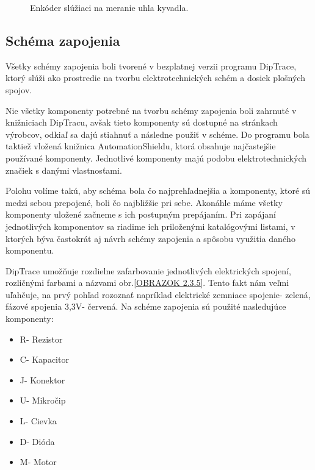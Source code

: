 \begin{figure}[!tbh]
	\hfill
	\hfill
	\hfill
	\caption{Enkóder slúžiaci na meranie uhla kyvadla.}\label{OBRAZOK 2.2}
\end{figure}

\newpage


\subsection{Schéma zapojenia}

Všetky schémy zapojenia boli tvorené v bezplatnej verzii programu DipTrace, ktorý slúži ako prostredie na tvorbu elektrotechnických schém a dosiek plošných spojov. 

Nie všetky komponenty potrebné na tvorbu schémy zapojenia boli zahrnuté v knižniciach DipTracu, avšak tieto komponenty sú dostupné na stránkach výrobcov, odkiaľ sa dajú stiahnuť a následne použiť v schéme\cite{AS5600Downl}\cite{TPS56339Downl}\cite{INAobr}. Do programu bola taktiež vložená knižnica AutomationShieldu, ktorá obsahuje najčastejšie používané komponenty. Jednotlivé komponenty majú podobu elektrotechnických značiek s danými vlastnosťami. 

Polohu volíme takú, aby schéma bola čo najprehľadnejšia a komponenty, ktoré sú medzi sebou prepojené, boli čo najbližšie pri sebe. Akonáhle máme všetky komponenty uložené začneme s ich postupným prepájaním. Pri zapájaní jednotlivých komponentov sa riadime ich priloženými katalógovými listami, v ktorých býva častokrát aj návrh schémy zapojenia a spôsobu využitia daného komponentu.

DipTrace umožňuje rozdielne zafarbovanie jednotlivých elektrických spojení, rozličnými farbami a názvami obr.\ref{OBRAZOK 2.3.5}. Tento fakt nám veľmi uľahčuje, na prvý pohľad rozoznať napríklad elektrické zemniace spojenie- zelená, fázové spojenia 3,3V- červená. Na schéme zapojenia sú použité nasledujúce komponenty:
\begin{multicols}{3}
	\begin{itemize}
		\item R- Rezistor
		\item C- Kapacitor
		\item J- Konektor
		\item U- Mikročip
		\item L- Cievka
		\item D- Dióda
		\item M- Motor
	\end{itemize}
\end{multicols}


